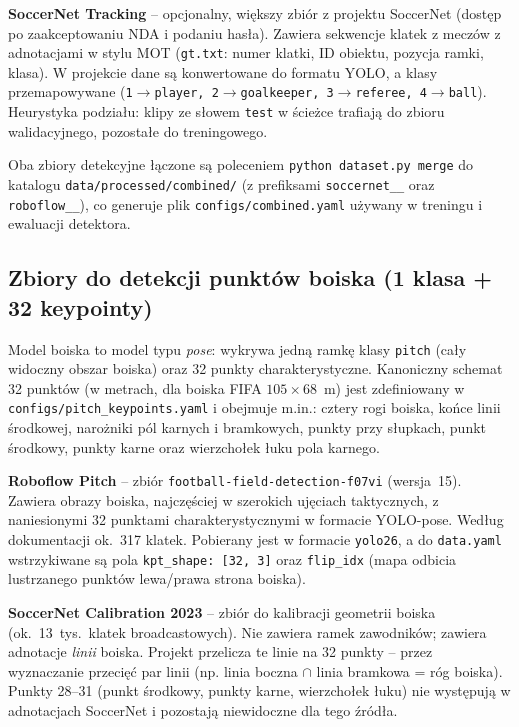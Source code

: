 \documentclass[11pt,a4paper]{article}
\begin{document}
\textbf{SoccerNet Tracking} -- opcjonalny, większy zbiór z projektu SoccerNet
(dostęp po zaakceptowaniu NDA i podaniu hasła). Zawiera sekwencje klatek z
meczów z adnotacjami w stylu MOT (\texttt{gt.txt}: numer klatki, ID obiektu,
pozycja ramki, klasa). W projekcie dane są konwertowane do formatu YOLO, a klasy
przemapowywane (\texttt{1$\rightarrow$player, 2$\rightarrow$goalkeeper,
3$\rightarrow$referee, 4$\rightarrow$ball}). Heurystyka podziału: klipy ze słowem
\texttt{test} w ścieżce trafiają do zbioru walidacyjnego, pozostałe do
treningowego.

Oba zbiory detekcyjne łączone są poleceniem \texttt{python dataset.py merge} do
katalogu \texttt{data/processed/combined/} (z prefiksami \texttt{soccernet\_\_}
oraz \texttt{roboflow\_\_}), co generuje plik \texttt{configs/combined.yaml}
używany w treningu i ewaluacji detektora.

\subsection{Zbiory do detekcji punktów boiska (1 klasa + 32 keypointy)}

Model boiska to model typu \emph{pose}: wykrywa jedną ramkę klasy
\texttt{pitch} (cały widoczny obszar boiska) oraz 32 punkty charakterystyczne.
Kanoniczny schemat 32 punktów (w metrach, dla boiska FIFA $105 \times 68$~m) jest
zdefiniowany w \texttt{configs/pitch\_keypoints.yaml} i obejmuje m.in.: cztery
rogi boiska, końce linii środkowej, narożniki pól karnych i bramkowych, punkty
przy słupkach, punkt środkowy, punkty karne oraz wierzchołek łuku pola karnego.

\textbf{Roboflow Pitch} -- zbiór \texttt{football-field-detection-f07vi}
(wersja~15). Zawiera obrazy boiska, najczęściej w szerokich ujęciach taktycznych,
z naniesionymi 32 punktami charakterystycznymi w formacie YOLO-pose. Według
dokumentacji ok.~317 klatek. Pobierany jest w formacie \texttt{yolo26}, a do
\texttt{data.yaml} wstrzykiwane są pola \texttt{kpt\_shape: [32, 3]} oraz
\texttt{flip\_idx} (mapa odbicia lustrzanego punktów lewa/prawa strona boiska).

\textbf{SoccerNet Calibration 2023} -- zbiór do kalibracji geometrii boiska
(ok.~13~tys.\ klatek broadcastowych). Nie zawiera ramek zawodników; zawiera
adnotacje \emph{linii} boiska. Projekt przelicza te linie na 32 punkty -- przez
wyznaczanie przecięć par linii (np. linia boczna $\cap$ linia bramkowa = róg
boiska). Punkty 28--31 (punkt środkowy, punkty karne, wierzchołek łuku) nie
występują w adnotacjach SoccerNet i pozostają niewidoczne dla tego źródła.
\end{document}
